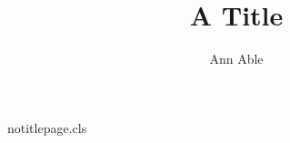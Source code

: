 \begin{filecontents*}[overwrite]{notitlepage.cls}
\def\nt@corr{}\newcommand\corr[1]{\gdef\nt@corr{#1}}
\def\@maketitle{\begin{center}{\Large\@title\par}{\@author\par}{Corresponding: \nt@corr\par}\end{center}}
\end{filecontents*}
\documentclass{notitlepage}
\title{A Title}
\author{Ann Able}

Text.

